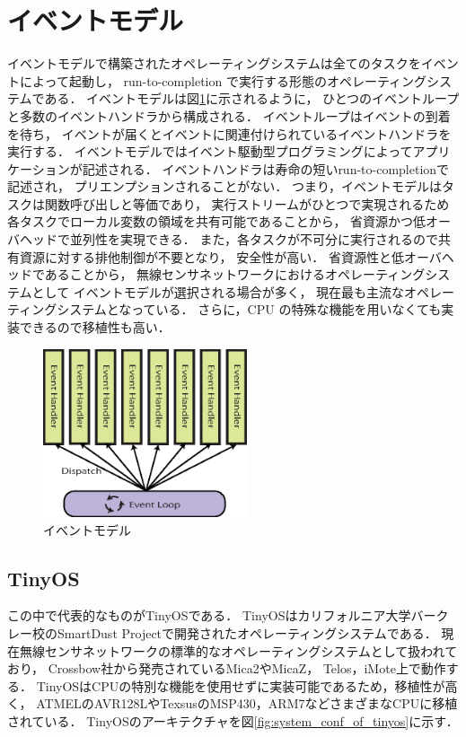 \section{イベントモデル}\label{sec:event_model}
イベントモデルで構築されたオペレーティングシステムは全てのタスクをイベントによって起動し，
run-to-completion で実行する形態のオペレーティングシステムである．
イベントモデルは図\ref{fig:event_model}に示されるように，
ひとつのイベントループと多数のイベントハンドラから構成される．
イベントループはイベントの到着を待ち，
イベントが届くとイベントに関連付けられているイベントハンドラを実行する．
イベントモデルではイベント駆動型プログラミングによってアプリケーションが記述される．
イベントハンドラは寿命の短いrun-to-completionで記述され，
プリエンプションされることがない．
つまり，イベントモデルはタスクは関数呼び出しと等価であり，
実行ストリームがひとつで実現されるため各タスクでローカル変数の領域を共有可能であることから，
省資源かつ低オーバヘッドで並列性を実現できる．
また，各タスクが不可分に実行されるので共有資源に対する排他制御が不要となり，
安全性が高い．
省資源性と低オーバヘッドであることから，
無線センサネットワークにおけるオペレーティングシステムとして
イベントモデルが選択される場合が多く，
現在最も主流なオペレーティングシステムとなっている．
さらに，CPU の特殊な機能を用いなくても実装できるので移植性も高い．
\begin{figure}[htbp]
 \begin{center}
  \includegraphics[width=60mm]{./images/event_model.eps}
 \end{center}
 \caption{イベントモデル}
 \label{fig:event_model}
\end{figure}


\subsection{TinyOS}
この中で代表的なものがTinyOS\cite{Hill:2000:SAD:356989.356998}\cite{Levis04tinyos:an}である．
TinyOSはカリフォルニア大学バークレー校のSmartDust Projectで開発されたオペレーティングシステムである．
現在無線センサネットワークの標準的なオペレーティングシステムとして扱われており，
Crossbow社から発売されているMica2やMicaZ\cite{Hill:2002:MWP:623308.624560}，
Telos\cite{Polastre:2005:TEU:1147685.1147744}，iMote\cite{Nachman:2005:IMP:1147685.1147760}上で動作する．
TinyOSはCPUの特別な機能を使用せずに実装可能であるため，移植性が高く，
ATMELのAVR128LやTexsusのMSP430，ARM7などさまざまなCPUに移植されている．
TinyOSのアーキテクチャを図\ref{fig:system_conf_of_tinyos}に示す．

